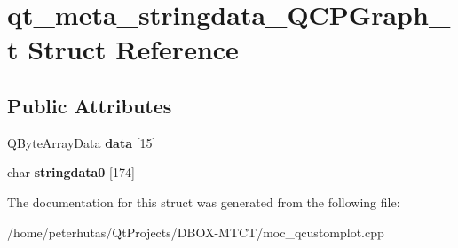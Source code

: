 \hypertarget{structqt__meta__stringdata___q_c_p_graph__t}{}\section{qt\+\_\+meta\+\_\+stringdata\+\_\+\+Q\+C\+P\+Graph\+\_\+t Struct Reference}
\label{structqt__meta__stringdata___q_c_p_graph__t}
\subsection*{Public Attributes}
\begin{DoxyCompactItemize}
\item 
\mbox{\label{structqt__meta__stringdata___q_c_p_graph__t_a070d55ece907072898e987f8594e5776}} 
Q\+Byte\+Array\+Data {\bfseries data} \mbox{[}15\mbox{]}
\item 
\mbox{\label{structqt__meta__stringdata___q_c_p_graph__t_a50b082c96ddea75773a05144ba6d44ca}} 
char {\bfseries stringdata0} \mbox{[}174\mbox{]}
\end{DoxyCompactItemize}


The documentation for this struct was generated from the following file\+:\begin{DoxyCompactItemize}
\item 
/home/peterhutas/\+Qt\+Projects/\+D\+B\+O\+X-\/\+M\+T\+C\+T/moc\+\_\+qcustomplot.\+cpp\end{DoxyCompactItemize}

